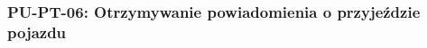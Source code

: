 \documentclass[a4paper,12pt]{article}
\begin{document}
\subsubsection{PU-PT-06: Otrzymywanie powiadomienia o przyjeździe pojazdu}

\begingroup %
\small %
\renewcommand{\arraystretch}{1.2} %

\newlength{\pierwszakolumnaszerokoscPUTPTPowiadPrzyjazd}
\setlength{\pierwszakolumnaszerokoscPUTPTPowiadPrzyjazd}{4.0cm}

\newlength{\drugakolumnaszerokoscPUTPTPowiadPrzyjazd}
\setlength{\drugakolumnaszerokoscPUTPTPowiadPrzyjazd}{\dimexpr\textwidth-\pierwszakolumnaszerokoscPUTPTPowiadPrzyjazd-2\tabcolsep-3\arrayrulewidth\relax}
\end{document}
